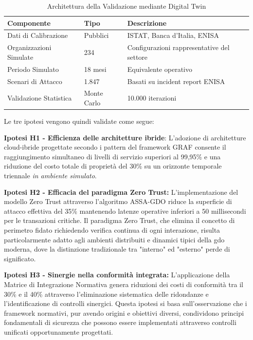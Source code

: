 \begin{table}[h]
\centering
\caption{Architettura della Validazione mediante Digital Twin}
\begin{tabular}{|l|l|p{6cm}|}
\hline
\textbf{Componente} & \textbf{Tipo} & \textbf{Descrizione} \\
\hline
Dati di Calibrazione & Pubblici & ISTAT, Banca d'Italia, ENISA \\
Organizzazioni Simulate & 234 & Configurazioni rappresentative del settore \\
Periodo Simulato & 18 mesi & Equivalente operativo \\
Scenari di Attacco & 1.847 & Basati su incident report ENISA \\
Validazione Statistica & Monte Carlo & 10.000 iterazioni \\
\hline
\end{tabular}
\end{table}

Le tre ipotesi vengono quindi validate come segue:

\textbf{Ipotesi H1 - Efficienza delle architetture ibride}: L'adozione di architetture cloud-ibride progettate secondo i pattern del framework GRAF consente il raggiungimento simultaneo di livelli di servizio superiori al 99,95\% e una riduzione del costo totale di proprietà del 30\% su un orizzonte temporale triennale \textit{in ambiente simulato}.

\textbf{Ipotesi H2 - Efficacia del paradigma Zero Trust:} L'implementazione del modello Zero Trust attraverso l'algoritmo ASSA-GDO riduce la superficie di attacco effettiva del 35\% mantenendo latenze operative inferiori a 50 millisecondi per le transazioni critiche. Il paradigma Zero Trust, che elimina il concetto di perimetro fidato richiedendo verifica continua di ogni interazione, risulta particolarmente adatto agli ambienti distribuiti e dinamici tipici della \gls{gdo} moderna, dove la distinzione tradizionale tra "interno" ed "esterno" perde di significato.

\textbf{Ipotesi H3 - Sinergie nella conformità integrata:} L'applicazione della Matrice di Integrazione Normativa genera riduzioni dei costi di conformità tra il 30\% e il 40\% attraverso l'eliminazione sistematica delle ridondanze e l'identificazione di controlli sinergici. Questa ipotesi si basa sull'osservazione che i framework normativi, pur avendo origini e obiettivi diversi, condividono principi fondamentali di sicurezza che possono essere implementati attraverso controlli unificati opportunamente progettati.

